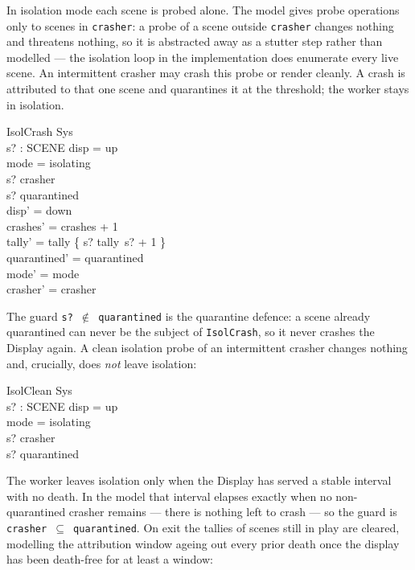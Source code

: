 \documentclass[a4paper,10pt,fleqn]{article}
\begin{document}
In isolation mode each scene is probed alone.  The model gives probe
operations only to scenes in \texttt{crasher}: a probe of a scene outside
\texttt{crasher} changes nothing and threatens nothing, so it is abstracted
away as a stutter step rather than modelled --- the isolation loop in the
implementation does enumerate every live scene.  An intermittent crasher may crash
this probe or render cleanly.  A crash is attributed to that one scene and
quarantines it at the threshold; the worker stays in isolation.

\begin{schema}{IsolCrash}
  \Delta Sys \\
  s? : SCENE
\where
  disp = up \\
  mode = isolating \\
  s? \in crasher \\
  s? \notin quarantined \\
  disp' = down \\
  crashes' = crashes + 1 \\
  tally' = tally \oplus \{ s? \mapsto tally~s? + 1 \} \\
  quarantined' = quarantined \\
  mode' = mode \\
  crasher' = crasher
\end{schema}

The guard \texttt{s? $\notin$ quarantined} is the quarantine defence: a scene
already quarantined can never be the subject of \texttt{IsolCrash}, so it never
crashes the Display again.  A clean isolation probe of an intermittent crasher
changes nothing and, crucially, does \emph{not} leave isolation:

\begin{schema}{IsolClean}
  \Xi Sys \\
  s? : SCENE
\where
  disp = up \\
  mode = isolating \\
  s? \in crasher \\
  s? \notin quarantined
\end{schema}

The worker leaves isolation only when the Display has served a stable interval
with no death.  In the model that interval elapses exactly when no
non-quarantined crasher remains --- there is nothing left to crash --- so the
guard is \texttt{crasher $\subseteq$ quarantined}.  On exit the tallies of scenes
still in play are cleared, modelling the attribution window ageing out every
prior death once the display has been death-free for at least a window:
\end{document}
